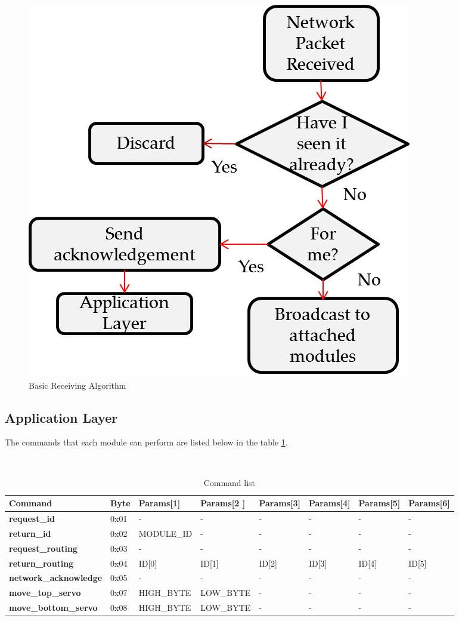 \begin{figure}[htb]
\centering
\includegraphics[scale = 0.35]{figures/receive_algorithm.png}
\caption{Basic Receiving Algorithm}
\label{fig:receiving_algorithm}
\end{figure}

\subsection{Application Layer}
 The commands that each module can perform are listed below in the table \ref{tab:command_list}. 
\begin{table}
  {\scriptsize\tt
   \begin{tabular}{| l | l | l | l | l | l | l |  l |}
  \hline
   Command & Byte & Params[1] & Params[2 ] & Params[3] & Params[4] &Params[5] & Params[6]\\ \hline
   {\bf request\_id} & 0x01 & - & - & - &- &- & -\\ \hline
   {\bf return\_id}& 0x02 & MODULE\_ID & - & - &- &- & - \\ \hline
   {\bf request\_routing} & 0x03  & - & - & - &- &- & - \\ \hline
   {\bf return\_routing} & 0x04 & ID[0] & ID[1] & ID[2] & ID[3] & ID[4] & ID[5] \\ \hline
   {\bf network\_acknowledge} & 0x05  & - & - & - &- &- & - \\ \hline
   {\bf move\_top\_servo} & 0x07 & HIGH\_BYTE & LOW\_BYTE  & - &- &- & -  \\ \hline
    {\bf move\_bottom\_servo} & 0x08 & HIGH\_BYTE & LOW\_BYTE  & - &- &- & -  \\ \hline
   \hline
  \end{tabular}
   \caption{Command list}
    \label{tab:command_list}
	}
 \end{table}

